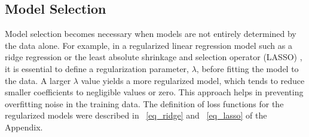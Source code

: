 \subsection{Model Selection}

Model selection becomes necessary when models are not entirely determined by the data alone. For example, in a regularized linear regression model such as a ridge regression \citep{hoerl_ridge_1970} or the least absolute shrinkage and selection operator (LASSO) \citep{tibshirani_regression_1996},  it is essential to define a regularization parameter, $\lambda$, before fitting the model to the data. A larger $\lambda$ value yields a more regularized model, which tends to reduce smaller coefficients to negligible values or zero. This approach helps in preventing overfitting noise in the training data. The definition of loss functions for the regularized models were described in ~\ref{eq_ridge} and ~\ref{eq_lasso} of the Appendix.

